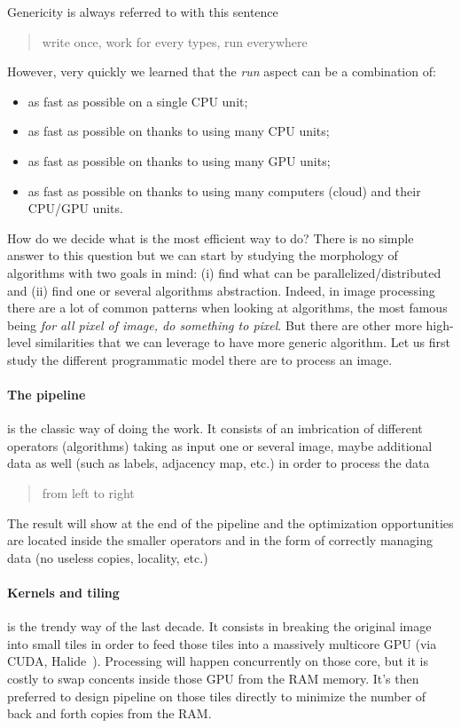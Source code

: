 Genericity is always referred to with this sentence \blockquote{write once, work for every types, run everywhere}.
However, very quickly we learned that the \emph{run} aspect can be a combination of:
\begin{itemize}
  \item as fast as possible on a single CPU unit;
  \item as fast as possible on thanks to using many CPU units;
  \item as fast as possible on thanks to using many GPU units;
  \item as fast as possible on thanks to using many computers (cloud) and their CPU/GPU units.
\end{itemize}
How do we decide what is the most efficient way to do? There is no simple answer to this question but we can start by
studying the morphology of algorithms with two goals in mind: (i) find what can be parallelized/distributed and (ii)
find one or several algorithms abstraction. Indeed, in image processing there are a lot of common patterns when looking
at algorithms, the most famous being \emph{for all pixel of image, do something to pixel}. But there are other more
high-level similarities that we can leverage to have more generic algorithm. Let us first study the different
programmatic model there are to process an image.

\paragraph{The pipeline} is the classic way of doing the work. It consists of an imbrication of different operators
(algorithms) taking as input one or several image, maybe additional data as well (such as labels, adjacency map, etc.)
in order to process the data \blockquote{from left to right}. The result will show at the end of the pipeline and the
optimization opportunities are located inside the smaller operators and in the form of correctly managing data (no
useless copies, locality, etc.)

\paragraph{Kernels and tiling} is the trendy way of the last decade. It consists in breaking the original image into
small tiles in order to feed those tiles into a massively multicore GPU (via CUDA,
Halide~\parencite{ragankelley.2013.halide}). Processing will happen concurrently on those core, but it is costly to swap
concents inside those GPU from the RAM memory. It's then preferred to design pipeline on those tiles directly to
minimize the number of back and forth copies from the RAM.

